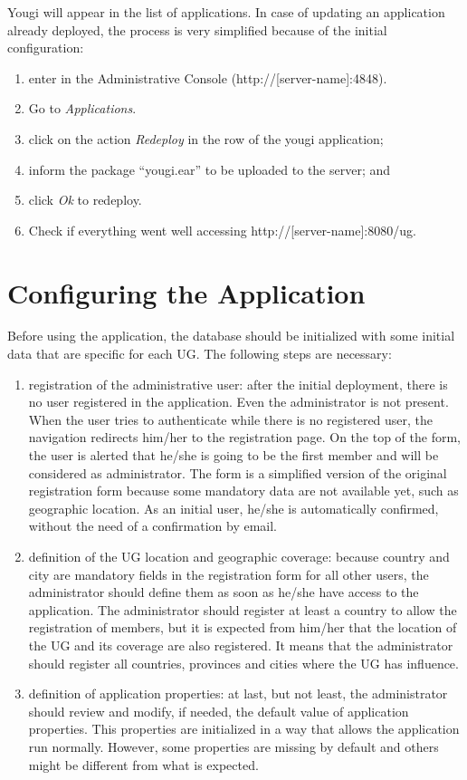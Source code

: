 \documentclass[envcountsame,envcountchap]{svmono}
\begin{document}
Yougi will appear in the list of applications. In case of updating an application already deployed, the process is very simplified because of the initial configuration:

\begin{enumerate}
\item enter in the Administrative Console (http://[server-name]:4848).
\item Go to \textit{Applications}.
\item click on the action \textit{Redeploy} in the row of the yougi application;
\item inform the package “yougi.ear” to be uploaded to the server; and
\item click \textit{Ok} to redeploy.
\item Check if everything went well accessing http://[server-name]:8080/ug.
\end{enumerate}

\section{Configuring the Application}

Before using the application, the database should be initialized with some initial data that are specific for each UG. The following steps are necessary:

\begin{enumerate}
\item registration of the administrative user: after the initial deployment, there is no user registered in the application. Even the administrator is not present. When the user tries to authenticate while there is no registered user, the navigation redirects him/her to the registration page. On the top of the form, the user is alerted that he/she is going to be the first member and will be considered as administrator. The form is a simplified version of the original registration form because some mandatory data are not available yet, such as geographic location. As an initial user, he/she is automatically confirmed, without the need of a confirmation by email.
\item definition of the UG location and geographic coverage: because country and city are mandatory fields in the registration form for all other users, the administrator should define them as soon as he/she have access to the application. The administrator should register at least a country to allow the registration of members, but it is expected from him/her that the location of the UG and its coverage are also registered. It means that the administrator should register all countries, provinces and cities where the UG has influence.
\item definition of application properties: at last, but not least, the administrator should review and modify, if needed, the default value of application properties. This properties are initialized in a way that allows the application run normally. However, some properties are missing by default and others might be different from what is expected.
\end{enumerate}
\end{document}
